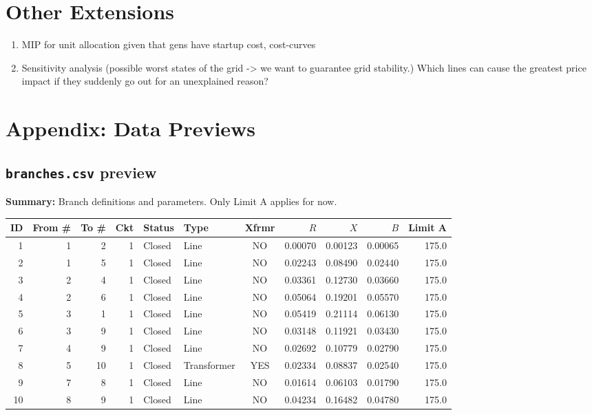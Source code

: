 \documentclass[11pt]{article}
\begin{document}
\section{Other Extensions}
\begin{enumerate}
    \item MIP for unit allocation given that gens have startup cost, cost-curves
    \item Sensitivity analysis (possible worst states of the grid -> we want to guarantee grid stability.) Which lines can cause the greatest price impact if they suddenly go out for an unexplained reason?
\end{enumerate}

\appendix
\newpage
\section{Appendix: Data Previews}

\subsection{\texttt{branches.csv} preview}\label{app:branches-preview}
\textbf{Summary:} Branch definitions and parameters. Only Limit A applies for now.

\scriptsize
\begin{longtable}{@{}rrrrllcrrrr@{}}
\toprule
ID & From \# & To \# & Ckt & Status & Type & Xfrmr & $R$ & $X$ & $B$ & Limit A \\
\midrule
\endhead
1  & 1 & 2  & 1 & Closed & Line        & NO  & 0.00070 & 0.00123 & 0.00065 & 175.0 \\
2  & 1 & 5  & 1 & Closed & Line        & NO  & 0.02243 & 0.08490 & 0.02440 & 175.0 \\
3  & 2 & 4  & 1 & Closed & Line        & NO  & 0.03361 & 0.12730 & 0.03660 & 175.0 \\
4  & 2 & 6  & 1 & Closed & Line        & NO  & 0.05064 & 0.19201 & 0.05570 & 175.0 \\
5  & 3 & 1  & 1 & Closed & Line        & NO  & 0.05419 & 0.21114 & 0.06130 & 175.0 \\
6  & 3 & 9  & 1 & Closed & Line        & NO  & 0.03148 & 0.11921 & 0.03430 & 175.0 \\
7  & 4 & 9  & 1 & Closed & Line        & NO  & 0.02692 & 0.10779 & 0.02790 & 175.0 \\
8  & 5 & 10 & 1 & Closed & Transformer & YES & 0.02334 & 0.08837 & 0.02540 & 175.0 \\
9  & 7 & 8  & 1 & Closed & Line        & NO  & 0.01614 & 0.06103 & 0.01790 & 175.0 \\
10 & 8 & 9  & 1 & Closed & Line        & NO  & 0.04234 & 0.16482 & 0.04780 & 175.0 \\
\bottomrule
\end{longtable}
\normalsize
\end{document}
